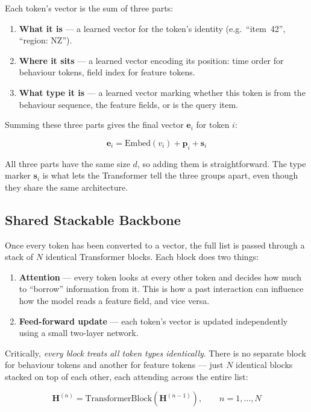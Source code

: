 \documentclass[10pt]{article}
\begin{document}
Each token's vector is the sum of three parts:
\begin{enumerate}[noitemsep]
    \item \textbf{What it is} --- a learned vector for the token's
          identity (e.g.\ ``item~42'', ``region: NZ'').
    \item \textbf{Where it sits} --- a learned vector encoding its
          position: time order for behaviour tokens, field index for
          feature tokens.
    \item \textbf{What type it is} --- a learned vector marking
          whether this token is from the behaviour sequence, the
          feature fields, or is the query item.
\end{enumerate}
Summing these three parts gives the final vector $\mathbf{e}_i$ for
token $i$:

\[
\mathbf{e}_i = \mathrm{Embed}(v_i) + \mathbf{p}_i + \mathbf{s}_i
\]

All three parts have the same size $d$, so adding them is
straightforward. The type marker $\mathbf{s}_i$ is what lets the
Transformer tell the three groups apart, even though they share the
same architecture.

\subsection{Shared Stackable Backbone}

Once every token has been converted to a vector, the full list is passed
through a stack of $N$ identical Transformer blocks. Each block does two
things:
\begin{enumerate}[noitemsep]
    \item \textbf{Attention} --- every token looks at every other token
          and decides how much to ``borrow'' information from it. This
          is how a past interaction can influence how the model reads a
          feature field, and vice versa.
    \item \textbf{Feed-forward update} --- each token's vector is
          updated independently using a small two-layer network.
\end{enumerate}
Critically, \emph{every block treats all token types identically}. There
is no separate block for behaviour tokens and another for feature tokens
--- just $N$ identical blocks stacked on top of each other, each
attending across the entire list:

\[
\mathbf{H}^{(n)} = \mathrm{TransformerBlock}\!\left(\mathbf{H}^{(n-1)}\right),
\qquad n = 1,\ldots,N
\]
\end{document}
